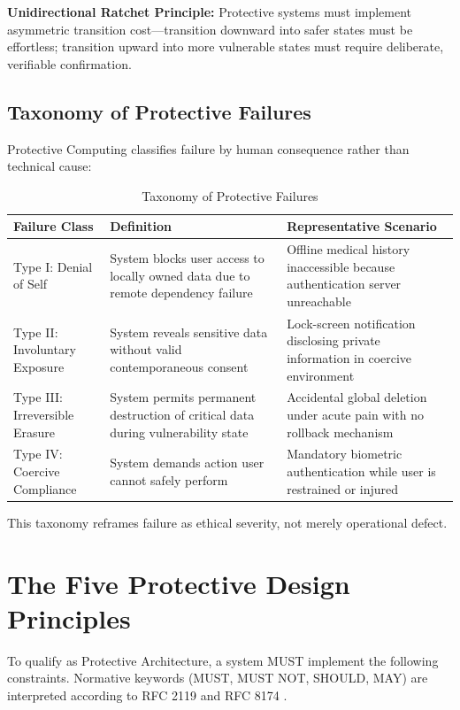 \documentclass[acmsmall,review]{acmart}
\begin{document}
\textbf{Unidirectional Ratchet Principle:} Protective systems must implement asymmetric transition cost---transition downward into safer states must be effortless; transition upward into more vulnerable states must require deliberate, verifiable confirmation.

\subsection{Taxonomy of Protective Failures}

Protective Computing classifies failure by human consequence rather than technical cause:

\begin{table}[h]
\centering
\caption{Taxonomy of Protective Failures}
\label{tab:failures}
\begin{tabular}{lll}
\toprule
\textbf{Failure Class} & \textbf{Definition} & \textbf{Representative Scenario} \\
\midrule
Type I: Denial of Self & System blocks user access to locally owned data due to remote dependency failure & Offline medical history inaccessible because authentication server unreachable \\
Type II: Involuntary Exposure & System reveals sensitive data without valid contemporaneous consent & Lock-screen notification disclosing private information in coercive environment \\
Type III: Irreversible Erasure & System permits permanent destruction of critical data during vulnerability state & Accidental global deletion under acute pain with no rollback mechanism \\
Type IV: Coercive Compliance & System demands action user cannot safely perform & Mandatory biometric authentication while user is restrained or injured \\
\bottomrule
\end{tabular}
\end{table}

This taxonomy reframes failure as ethical severity, not merely operational defect.

\section{The Five Protective Design Principles}

To qualify as Protective Architecture, a system MUST implement the following constraints. Normative keywords (MUST, MUST NOT, SHOULD, MAY) are interpreted according to RFC 2119 \cite{IETF1997} and RFC 8174 \cite{Leiba2017}.
\end{document}
